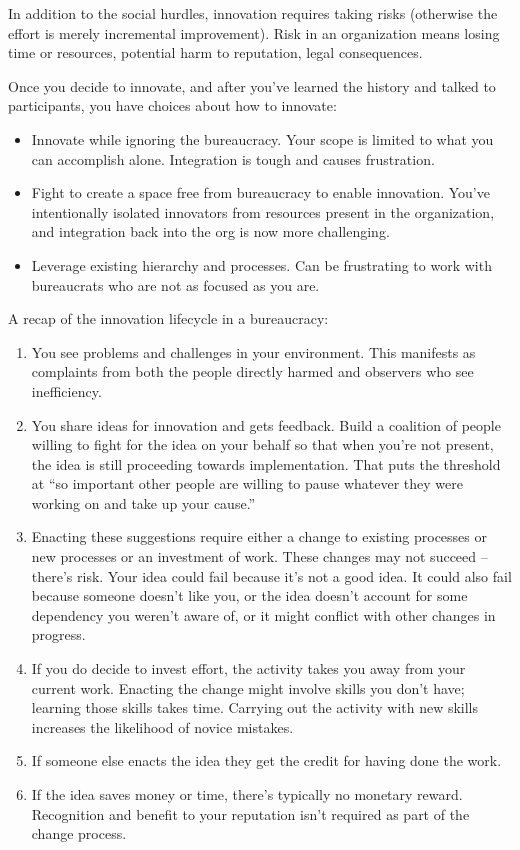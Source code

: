 In addition to the social hurdles, innovation requires taking risks (otherwise the effort is merely incremental improvement). Risk in an organization means losing time or resources, potential harm to reputation, legal consequences. 

Once you decide to innovate, and after you've learned the history and talked to participants, you have choices about how to innovate:
\begin{itemize}
\item Innovate while ignoring the bureaucracy. Your scope is limited to what you can accomplish alone. Integration is tough and causes frustration.
\item Fight to create a space free from bureaucracy to enable innovation. You've intentionally isolated innovators from resources present in the organization, and integration back into the org is now more challenging. 
\item Leverage existing hierarchy and processes. Can be frustrating to work with bureaucrats who are not as focused as you are.
\end{itemize}


A recap of the innovation lifecycle in a bureaucracy:
\begin{enumerate}
    \item You see problems and challenges in your environment. This manifests as complaints from both the people directly harmed and observers who see inefficiency.
    \item You share ideas for innovation and gets feedback. Build a coalition of people willing to fight for the idea on your behalf
    so that when you're not present, the idea is still proceeding towards implementation.  That puts the threshold at ``so important other people are willing to pause whatever they were working on and take up your cause.''
    \item Enacting these suggestions require either a change to existing processes or new processes or an investment of work. These changes may not succeed -- there's risk. Your idea could fail because it's not a good idea. It could also fail because someone doesn't like you, or the idea doesn't account for some dependency you weren't aware of, or it might conflict with other changes in progress.
    \item If you do decide to invest effort, the activity takes you away from your current work. Enacting the change might involve skills you don't have; learning those skills takes time. Carrying out the activity with new skills increases the likelihood of novice mistakes.
    \item If someone else enacts the idea they get the credit for having done the work.
    \item If the idea saves money or time, there's typically no monetary reward. Recognition and benefit to your reputation isn't required as part of the change process. 
\end{enumerate}

